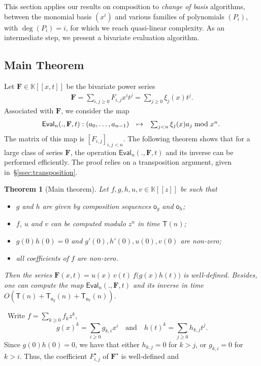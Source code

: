\documentclass{sig-alternate}
\def\F {\ensuremath{\mathbf{F}}}
\def\K {\ensuremath{\mathbb{K}}}
\def\T{\ensuremath{\mathsf{T}}}
\def\o {\ensuremath{\mathsf{o}}}
\def\Eval {\ensuremath{\mathsf{Eval}}}
\def\myproof{\noindent{\sc Proof.}~}
\newtheorem{theorem}{Theorem}
\begin{document}
This section applies our results on composition to \emph{change of
basis} algorithms, between the monomial basis $(x^i)$ and various
families of polynomials $(P_i)$, with $\deg(P_i)=i$, for which we
reach quasi-linear complexity. As an intermediate step, we present a
bivariate evaluation algorithm.



\subsection{Main Theorem}

Let $\F\in \K[[x,t]]$ be the bivariate power series
$$
\begin{array}{l}
\F=\sum_{i,j \ge 0} F_{i,j} x^i t^j =\sum_{j \ge 0} \xi_j(x) t^j.
\end{array}
$$
Associated with $\F$, we consider the map
$$\begin{array}{ccc}
\hspace{-1mm}\Eval_n(.,\F,t):  (a_0,\dots,a_{n-1}) & \mapsto & \sum_{j < n}\xi_j(x) a_j \bmod x^n.
\end{array}$$ The matrix of this map is $[F_{i,j}]_{i,j < n}$.
The following theorem shows that for a large class of series $\F$, the
operation $\Eval_n(.,\F,t)$ and its inverse can be performed
efficiently. The proof relies on a transposition
argument, given in~\S\ref{ssec:transposition}.\begin{theorem}[Main theorem]\label{Prop:3}
Let $f,g,h,u,v \in \K[[z]]$ be such that
\begin{itemize}
\item $g$ and $h$ are given by composition sequences $\o_g$ and $\o_h$;
\item $f$, $u$ and $v$ can be computed modulo $z^n$ in time $\T(n)$;
\item $g(0)h(0)=0$ and $g'(0),h'(0),u(0),v(0)$ are non-zero;
\item  all coefficients of $f$
  are non-zero.
\end{itemize}
Then the series
$\F(x,t)=u(x)\, v(t)\, f\big (g(x)h(t) \big )$ is
well-defi\-ned. Besides, one can compute the map $\Eval_n(.,\F,t)$ and
its inverse in time $O(\T(n)+\T_{\o_g}(n)+\T_{\o_h}(n))$.
\end{theorem}
\myproof Write $f=\sum_{k \ge 0} f_k z^k$,
$$g(x)^k=\sum_{i \ge 0}
g_{k,i} x^i \quad\text{and}\quad h(t)^k=\sum_{j \ge 0} h_{k,j} t^j.$$ Since
$g(0)h(0)=0$, we have that either
$h_{k,j}=0$ for $k > j$, or $g_{k,i}=0$ for $k>i$. 
Thus, the coefficient
$F^\star_{i,j}$ of $\F^\star$ is well-defined and
\end{document}
